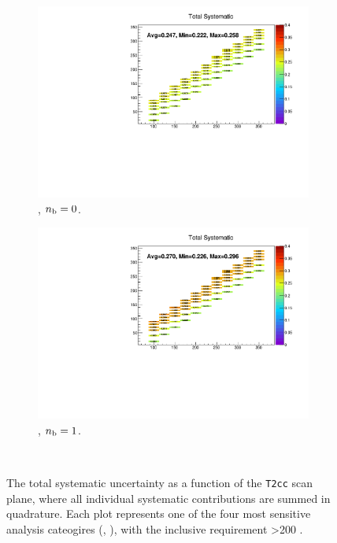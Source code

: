 \begin{figure}[h!]
\begin{subfigure}[b]{0.47\textwidth}
    \includegraphics[width=\textwidth]{Figs/sms/t2cc/v37/systs_v2/total_T2cc_eq0b_ge4j_incl.pdf}
    \caption{\njhigh, $n_{\text{b}} = 0$.}
  \end{subfigure}
  \begin{subfigure}[b]{0.47\textwidth}
    \includegraphics[width=\textwidth]{Figs/sms/t2cc/v37/systs_v2/total_T2cc_eq1b_ge4j_incl.pdf}
    \caption{\njhigh, $n_{\text{b}} = 1$.}
  \end{subfigure}\\
  \caption{The total systematic uncertainty as a function of the \texttt{T2cc} scan plane,
  where all individual systematic contributions are summed in quadrature.
  Each plot represents one of the four most sensitive 
  analysis cateogires (\nb, \nj), with the inclusive requirement \HT>200 \gev.}
  \label{fig:sms-totalsyst-t2cc}
\end{figure}

